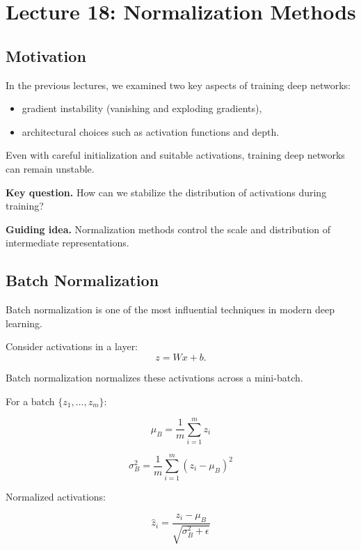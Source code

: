 \section{Lecture 18: Normalization Methods}

\subsection{Motivation}

In the previous lectures, we examined two key aspects of training deep networks:

\begin{itemize}
    \item gradient instability (vanishing and exploding gradients),
    \item architectural choices such as activation functions and depth.
\end{itemize}

\medskip

Even with careful initialization and suitable activations, training deep networks can remain unstable.

\medskip

\textbf{Key question.}  
How can we stabilize the distribution of activations during training?

\medskip

\textbf{Guiding idea.}  
Normalization methods control the scale and distribution of intermediate representations.

\subsection{Batch Normalization}

Batch normalization is one of the most influential techniques in modern deep learning.

\medskip

Consider activations in a layer:
\[
z = W x + b.
\]

Batch normalization normalizes these activations across a mini-batch.

\medskip

For a batch $\{z_1,\dots,z_m\}$:

\[
\mu_B = \frac{1}{m}\sum_{i=1}^m z_i
\]

\[
\sigma_B^2 = \frac{1}{m}\sum_{i=1}^m (z_i-\mu_B)^2
\]

Normalized activations:

\[
\hat{z}_i = \frac{z_i - \mu_B}{\sqrt{\sigma_B^2 + \epsilon}}
\]

